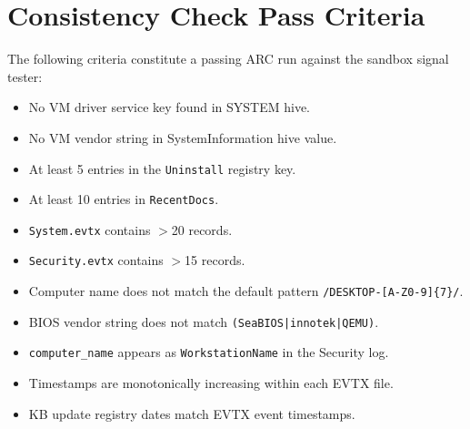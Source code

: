 \documentclass[12pt,a4paper]{article}
\begin{document}
\section{Consistency Check Pass Criteria}
\label{app:checks}

The following criteria constitute a passing ARC run against the sandbox signal
tester:

\begin{itemize}[noitemsep,leftmargin=2em]
  \item No VM driver service key found in SYSTEM hive.
  \item No VM vendor string in SystemInformation hive value.
  \item At least 5 entries in the \texttt{Uninstall} registry key.
  \item At least 10 entries in \texttt{RecentDocs}.
  \item \texttt{System.evtx} contains $>$20 records.
  \item \texttt{Security.evtx} contains $>$15 records.
  \item Computer name does not match the default pattern
        \texttt{/DESKTOP-[A-Z0-9]\{7\}/}.
  \item BIOS vendor string does not match
        \texttt{(SeaBIOS|innotek|QEMU)}.
  \item \texttt{computer\_name} appears as \texttt{WorkstationName} in the
        Security log.
  \item Timestamps are monotonically increasing within each EVTX file.
  \item KB update registry dates match EVTX event timestamps.
\end{itemize}
\end{document}
